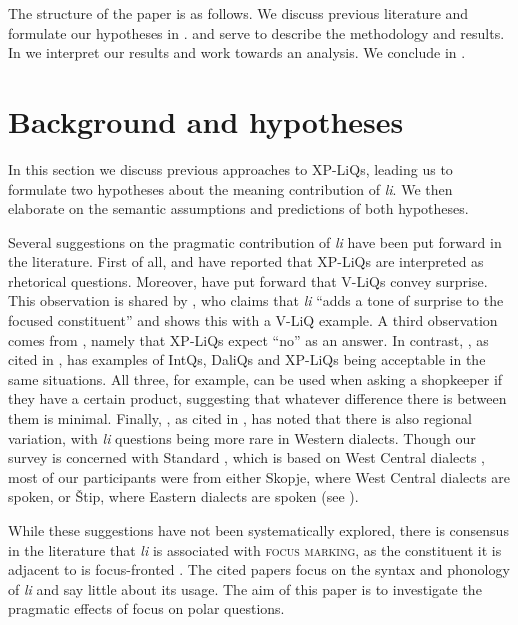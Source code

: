 \documentclass[output=paper]{langscibook}
\begin{document}
The structure of the paper is as follows. We discuss previous literature and formulate our hypotheses in .  and  serve to describe the methodology and results. In  we interpret our results and work towards an analysis. We conclude in .
\section{Background and hypotheses}\label{sec:back}

In this section we discuss previous approaches to XP-LiQs, leading us to formulate two hypotheses about the meaning contribution of \textit{li}. We then elaborate on the semantic assumptions and predictions of both hypotheses.

Several suggestions on the pragmatic contribution of \textit{li} have been put forward in the literature. First of all, \citet{minova1987} and \citet{Rudin.Kramer.Billings.Baerman1999} have reported that XP-LiQs are interpreted as rhetorical questions. Moreover, \citet{Rudin.Kramer.Billings.Baerman1999} have put forward that V-LiQs convey surprise. This observation is shared by \citet[137]{lazarova2003},  who claims that \textit{li} ``adds a tone of surprise to the focused constituent'' and shows this with a V-LiQ example. A third observation comes from \citet{englund1977}, namely that XP-LiQs expect ``no'' as an answer. In contrast, \citet{kramer1985}, as cited in \citet{Rudin.Kramer.Billings.Baerman1999}, has examples of IntQs, DaliQs and XP-LiQs being acceptable in the same situations. All three, for example, can be used when asking a shopkeeper if they have a certain product, suggesting that whatever difference there is between them is minimal. Finally, \citet{koneski1965}, as cited in \citet[128]{englund1977}, has noted that there is also regional variation, with \textit{li} questions being more rare in Western dialects. Though our survey is concerned with Standard , which is based on West Central dialects \citep{Friedman2001}, most of our participants were from either Skopje, where West Central dialects are spoken, or Štip, where Eastern dialects are spoken (see ).

While these suggestions have not been systematically explored, there is consensus in the literature that
\textit{li} is associated with \textsc{focus marking}, as the constituent it is adjacent to is focus-fronted \citep{Tomic1996a, Rudin.Kramer.Billings.Baerman1999,schwabe2004,lazarova2003}. The cited papers focus on the syntax and phonology of \textit{li} and say little about its usage. The aim of this paper is to investigate the pragmatic effects of focus on polar questions.
\end{document}

